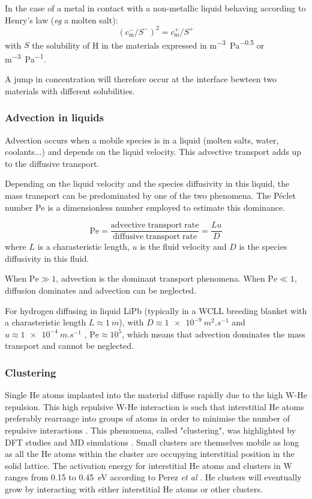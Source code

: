 In the case of a metal in contact with a non-metallic liquid behaving according to Henry's law (\textit{eg} a molten salt):
\begin{equation}
    (c_\mathrm{m}^-/S^-)^2 = c_\mathrm{m}^+/S^+
\end{equation}
with $S$ the solubility of H in the materials expressed in \si{m^{-3}.Pa^{-0.5}} or \si{m^{-3}.Pa^{-1}}.

A jump in concentration will therefore occur at the interface bewteen two materials with different solubilities.

\subsubsection{Advection in liquids}
Advection occurs when a mobile species is in a liquid (molten salts, water, coolants...) and depends on the liquid velocity.
This advective transport adds up to the diffusive transport.

Depending on the liquid velocity and the species diffusivity in this liquid, the mass transport can be predominated by one of the two phenomena.
The Péclet number $\mathrm{Pe}$ is a dimensionless number employed to estimate this dominance.

\begin{equation}
    \mathrm{Pe} = \frac{\mathrm{advective \; transport \; rate}}{\mathrm{diffusive \; transport \; rate}} = \frac{L u}{D}
\end{equation}
where $L$ is a charasteristic length, $u$ is the fluid velocity and $D$ is the species diffusivity in this fluid.

When $\mathrm{Pe} \gg 1$, advection is the dominant transport phenomena.
When $\mathrm{Pe} \ll 1$, diffusion dominates and advection can be neglected.

For hydrogen diffusing in liquid LiPb (typically in a WCLL breeding blanket with a charasteristic length $L \approx \SI{1}{m}$), with $D \approx \SI{1e-9}{m^2.s^{-1}}$ and $u \approx \SI{1e-4}{m.s^{-1}}$ , $\mathrm{Pe} \approx 10^{5}$, which means that advection dominates the mass transport and cannot be neglected.

\subsubsection{Clustering}
Single He atoms implanted into the material diffuse rapidly due to the high W-He repulsion.
This high repulsive W-He interaction is such that interstitial He atoms preferably rearrange into groups of atoms in order to minimise the number of repulsive interactions .
This phenomena, called "clustering", was highlighted by DFT studies \cite{becquart_density_2009,dunn_rate_2013} and MD simulations \cite{henriksson_molecular_2006}.
Small clusters are themselves mobile as long as all the He atoms within the cluster are occupying interstitial position in the solid lattice.
The activation energy for interstitial He atoms and clusters in W ranges from 0.15 to \SI{0.45}{eV} according to Perez \textit{et al} .
He clusters will eventually grow by interacting with either interstitial He atoms or other clusters.


